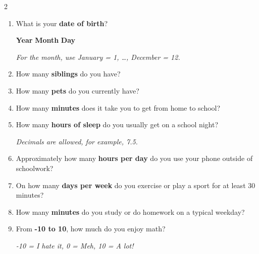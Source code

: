 	\noindent
	\hspace*{-0.99cm}%
	\begin{minipage}{\dimexpr\textwidth+0.5cm\relax}
		\begin{multicols}{2}
			\begin{enumerate}
				
				\item What is your \textbf{date of birth}?
				
				\hfill
				\textbf{Year} \NumberAnswerBox
				\hspace{0.3cm}
				\textbf{Month} \ShortNumberAnswerBox
				\hspace{0.3cm}
				\textbf{Day} \ShortNumberAnswerBox
				
				\textit{For the month, use January = 1, \ldots, December = 12.}
				
				\item How many \textbf{siblings} do you have?
				\hfill \NumberAnswerBox
				
				\item How many \textbf{pets} do you currently have?
				\hfill \NumberAnswerBox
				
				\item How many \textbf{minutes} does it take you to get from home to school?
				\hfill \NumberAnswerBox
				
				\item How many \textbf{hours of sleep} do you usually get on a school night?
				\hfill \NumberAnswerBox
				
				\textit{Decimals are allowed, for example, 7.5.}
				
				\item Approximately how many \textbf{hours per day} do you use your phone outside of schoolwork?
				\hfill \NumberAnswerBox
				
				\item On how many \textbf{days per week} do you exercise or play a sport for at least 30 minutes?
				\hfill \NumberAnswerBox
				
				\item How many \textbf{minutes} do you study or do homework on a typical weekday?
				\hfill \NumberAnswerBox
				
				\item From \textbf{-10 to 10}, how much do you enjoy math?
				
				\textit{-10 = I hate it, 0 = Meh, 10 = A lot!}
				\hfill \NumberAnswerBox
				

\end{enumerate}
\end{multicols}
\end{minipage}
